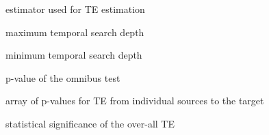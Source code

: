 \documentclass[letterpaper,10pt,english]{sphinxmanual}
\begin{document}
\begin{fulllineitems}

\begin{fulllineitems}
\label{index:multivariate_te.Multivariate_te.estimator_name}
estimator used for TE estimation

\end{fulllineitems}


\begin{fulllineitems}
\label{index:multivariate_te.Multivariate_te.max_lag}
maximum temporal search depth

\end{fulllineitems}


\begin{fulllineitems}
\label{index:multivariate_te.Multivariate_te.min_lag}
minimum temporal search depth

\end{fulllineitems}


\begin{fulllineitems}
\label{index:multivariate_te.Multivariate_te.pvalue_omnibus}
p-value of the omnibus test

\end{fulllineitems}


\begin{fulllineitems}
\label{index:multivariate_te.Multivariate_te.pvalue_individual_sources}
array of p-values for TE from individual
sources to the target

\end{fulllineitems}


\begin{fulllineitems}
\label{index:multivariate_te.Multivariate_te.sign_ominbus}
statistical significance of the over-all TE


\end{fulllineitems}
\end{fulllineitems}
\end{document}
